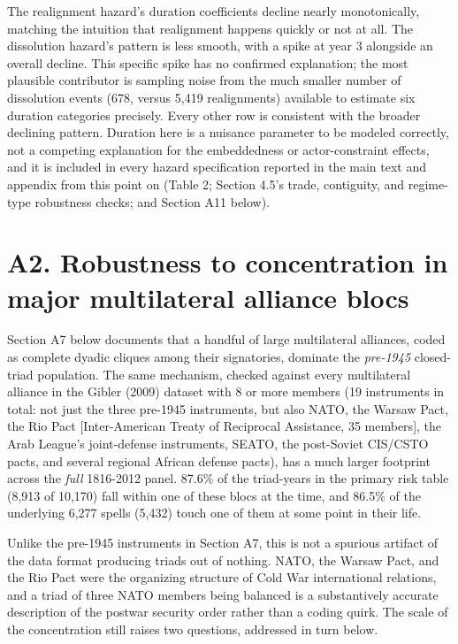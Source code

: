 \documentclass[Afour,sageh,times,doublespace]{sagej}
\begin{document}
The realignment hazard's duration coefficients decline nearly monotonically, matching the intuition that realignment happens quickly or not at all. The dissolution hazard's pattern is less smooth, with a spike at year 3 alongside an overall decline. This specific spike has no confirmed explanation; the most plausible contributor is sampling noise from the much smaller number of dissolution events (678, versus 5,419 realignments) available to estimate six duration categories precisely. Every other row is consistent with the broader declining pattern. Duration here is a nuisance parameter to be modeled correctly, not a competing explanation for the embeddedness or actor-constraint effects, and it is included in every hazard specification reported in the main text and appendix from this point on (Table 2; Section 4.5's trade, contiguity, and regime-type robustness checks; and Section A11 below).

\section*{A2. Robustness to concentration in major multilateral alliance blocs}

Section A7 below documents that a handful of large multilateral alliances, coded as complete dyadic cliques among their signatories, dominate the \emph{pre-1945} closed-triad population. The same mechanism, checked against every multilateral alliance in the Gibler (2009) dataset with 8 or more members (19 instruments in total: not just the three pre-1945 instruments, but also NATO, the Warsaw Pact, the Rio Pact [Inter-American Treaty of Reciprocal Assistance, 35 members], the Arab League's joint-defense instruments, SEATO, the post-Soviet CIS/CSTO pacts, and several regional African defense pacts), has a much larger footprint across the \emph{full} 1816-2012 panel. 87.6\% of the triad-years in the primary risk table (8,913 of 10,170) fall within one of these blocs at the time, and 86.5\% of the underlying 6,277 spells (5,432) touch one of them at some point in their life.

Unlike the pre-1945 instruments in Section A7, this is not a spurious artifact of the data format producing triads out of nothing. NATO, the Warsaw Pact, and the Rio Pact were the organizing structure of Cold War international relations, and a triad of three NATO members being balanced is a substantively accurate description of the postwar security order rather than a coding quirk. The scale of the concentration still raises two questions, addressed in turn below.
\end{document}

